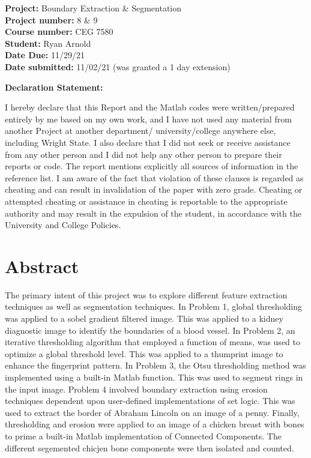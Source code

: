 \documentclass[./rarnold_project_89.tex]{subfiles}
\begin{document}


\begin{titlepage}

\noindent
\textbf{Project:} Boundary Extraction \& Segmentation \\
\textbf{Project number:} 8 \& 9\\
\textbf{Course number:} CEG 7580\\
\textbf{Student:} Ryan Arnold \\
\textbf{Date Due:} 11/29/21 \\
\textbf{Date submitted:} 11/02/21 (was granted a 1 day extension)
\vspace{24pt}

\noindent \textbf{Declaration Statement: }

\noindent I hereby declare that this Report and the Matlab codes were written/prepared entirely by me based on my own work, and I have not used any material from another Project at another department/ university/college anywhere else, including Wright State. I also declare that I did not seek or receive assistance from any other person and I did not help any other person to prepare their reports or code.  The report mentions explicitly all sources of information in the reference list. I am aware of the fact that violation of these clauses is regarded as cheating and can result in invalidation of the paper with zero grade. Cheating or attempted cheating or assistance in cheating is reportable to the appropriate authority and may result in the expulsion of the student, in accordance with the University and College Policies.

\end{titlepage}

\clearpage
\section*{Abstract}

\noindent The primary intent of this project was to explore different feature extraction techniques as well as segmentation techniques.
In Problem 1, global thresholding was applied to a sobel gradient filtered image.  This was applied to a kidney diagnostic image to 
identify the boundaries of a blood vessel.  In Problem 2, an iterative thresholding algorithm that employed a function of means, was used to 
optimize a global threshold level.  This was applied to a thumprint image to enhance the fingerprint pattern.  In Problem 3, the Otsu 
thresholding method was implemented using a built-in Matlab function.  This was used to segment rings in the input image.  Problem 4 involved
boundary extraction using erosion techniques dependent upon user-defined implementations of set logic.  This was used to extract the border
of Abraham Lincoln on an image of a penny.  Finally, thresholding and erosion were applied to an image of a chicken breast with bones 
to prime a built-in Matlab implementation of Connected Components.  The different segemented chicjen bone components were then isolated and counted.
\end{document}
